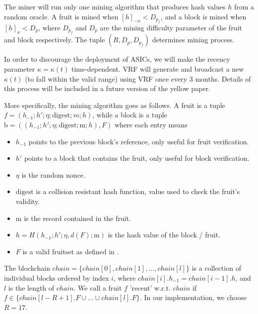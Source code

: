 \documentclass[9pt,oneside]{amsart}
\begin{document}
\begin{multicols}{2}
The miner will run only one mining algorithm that produces hash values $h$ from a random oracle. A fruit is mined when $[h]_{-\kappa} < D_{p_f}$, and a block is mined when $[h]_{\kappa} < D_{p}$, where $D_{p_f}$ and $D_p$ are the mining difficulty parameter of the fruit and block respectively. The tuple $(R, D_p, D_{p_f})$ determines mining process. 

In order to discourage the deployment of ASICs, we will make the recency parameter $\kappa = \kappa (t)$ time-dependent. VRF will generate and broadcast a new $\kappa (t)$ (to fall within the valid range) using VRF once every 3 months. Details of this process will be included in a future version of the yellow paper. 


More specifically, the mining algorithm goes as follows. A fruit is a tuple $f = (h_{-1}; h'; \eta ; \mathrm{digest}; m; h)$, while a block is a tuple $\mathrm{b} = ((h_{-1}; h'; \eta; \mathrm{digest}; \mathrm{m}; h), F)$ where each entry means

\begin{itemize}
	\item $h_{-1}$ points to the previous block's reference, only useful for fruit verification.
	
	\item $h'$ points to a block that contains the fruit, only useful for block verification. 
	
	\item $\eta$ is the random nonce. 
	
	\item $\mathrm{digest}$ is a collision resistant hash function, value used to check the fruit's validity. 
	
	\item $\mathrm{m}$ is the record contained in the fruit.
	
	\item $h = H(h_{-1}; h' ; \eta , d(F); \mathrm{m})$ is the hash value of the block / fruit.	
	
	\item $F$ is a valid fruitset as defined in \cite{pass2017fruit}.
\end{itemize}


The blockchain $chain = \{ chain[0] , chain[1] , ... , chain[l] \}$ is a collection of individual blocks ordered by index $i$, where $chain[i].h_{-1} = chain[i-1].h$, and $l$ is the length of $chain$. We call a fruit $f$ 'recent' w.r.t. $chain$ if $f \in \{ chain[l-R+1].F \cup ... \cup chain[l].F \}$. In our implementation, we choose $R = 17$. 
 

\end{multicols}
\end{document}
